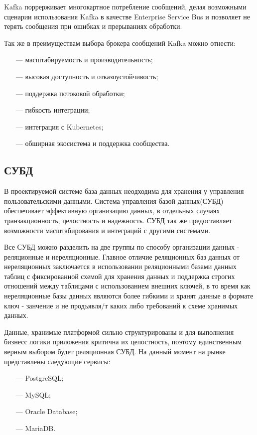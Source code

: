 Kafka поррерживает многокартное потребление сообщений, делая возможными сценарии использования Kafka в качестве Enterprise Service Bus\cite{menge2007enterprise} и позволяет не терять сообщения при ошибках и прерываниях обработки.

Так же в преимуществам выбора брокера сообщений Kafka можно отнести:

\begin{itemize}
  \item[---]масштабируемость и производительность;
  \item[---]высокая доступность и отказоустойчивость;
  \item[---]поддержка потоковой обработки;
  \item[---]гибкость интеграции;
  \item[---]интеграция с Kubernetes;
  \item[---]обширная экосистема и поддержка сообщества.
\end{itemize}

\subsection{СУБД}

В проектируемой системе база данных неодходима для хранения у управления пользовательскими данными. Система управления базой данных(СУБД) обеспечивает эффективную организацию данных, в отдельных случаях транзакционность, целостность и надежность. СУБД так же предоставляет возможности масштабирования и интеграций с другими системами.

Все СУБД можно разделить на две группы по способу организации данных - реляционные и нереляционные. Главное отличие реляционных баз данных от нереляционных заключается в использовании реляционными базами данных таблиц с фиксированной схемой для хранения данных и поддержка строгих отношений между таблицами с использованием внешних ключей, в то время как нереляционные базы данных являются более гибкими и хранят данные в формате ключ - занчение и не продъявля/т каких либо требований к схеме хранимых данных.

Данные, хранимые платформой сильно структурированы и для выполнения бизнесс логики приложения критична их целостность, поэтому единственным верным выбором будет реляционная СУБД. На данный момент на рынке представлены следующие сервисы:

\begin{itemize}
  \item[---]PostgreSQL;
  \item[---]MySQL;
  \item[---]Oracle Database;
  \item[---]MariaDB.
\end{itemize}

